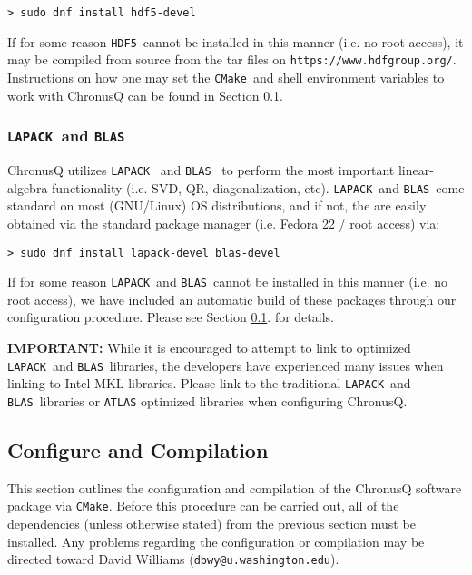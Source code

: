 \documentclass[12pt]{article}
\makeatletter
\newcommand{\DBWYContact}{David Williams (\texttt{dbwy@u.washington.edu})}
\newcommand{\CMake}{\texttt{CMake}}
\newcommand{\HDF}{\texttt{HDF5}}
\newcommand{\LAPACK}{\texttt{LAPACK}}
\newcommand{\BLAS}{\texttt{BLAS}}
\makeatother
\begin{document}
	\begin{lstlisting}
> sudo dnf install hdf5-devel
	\end{lstlisting}

	\noindent If for some reason \HDF~cannot be installed in this manner (i.e. 
	no root access), it may be compiled from source from the tar files on
	\texttt{https://www.hdfgroup.org/}. Instructions on how one may set
	the \CMake~and shell environment variables to work with ChronusQ
	can be found in Section \ref{subsec:ChronusQConfigCompile}.

      \subsubsection{\LAPACK~and \BLAS} \label{subsubsec:LA} 
        ChronusQ utilizes \LAPACK~\cite{lapack} and \BLAS~\cite{blas1,blas2,blas3,atlas} to perform
        the most important linear-algebra functionality (i.e. SVD, QR, 
	diagonalization, etc). \LAPACK~and \BLAS~come standard on most
	(GNU/Linux) OS distributions, and if not, the are easily obtained via
	the standard package manager (i.e. Fedora 22 / root access) via:

	\begin{lstlisting}
> sudo dnf install lapack-devel blas-devel
	\end{lstlisting}

	\noindent If for some reason \LAPACK~and \BLAS~cannot be installed in this 
	manner (i.e. no root access), we have included an automatic build of these 
	packages through our configuration procedure. Please see Section 
	\ref{subsec:ChronusQConfigCompile}. for details.

	\noindent \textbf{IMPORTANT:} While it is encouraged to attempt to link to 
	optimized \LAPACK~and \BLAS~libraries, the developers have experienced many 
	issues when linking to Intel MKL libraries. Please link to the traditional 
	\LAPACK~and \BLAS~libraries or \texttt{ATLAS} optimized libraries when 
	configuring ChronusQ.


    \subsection{Configure and Compilation} \label{subsec:ChronusQConfigCompile}
    
    This section outlines the configuration and compilation of the ChronusQ
    software package via \CMake. Before this procedure can be carried out,
    all of the dependencies (unless otherwise stated) from the previous section
    must be installed. Any problems regarding the configuration or compilation
    may be directed toward \DBWYContact.
\end{document}
